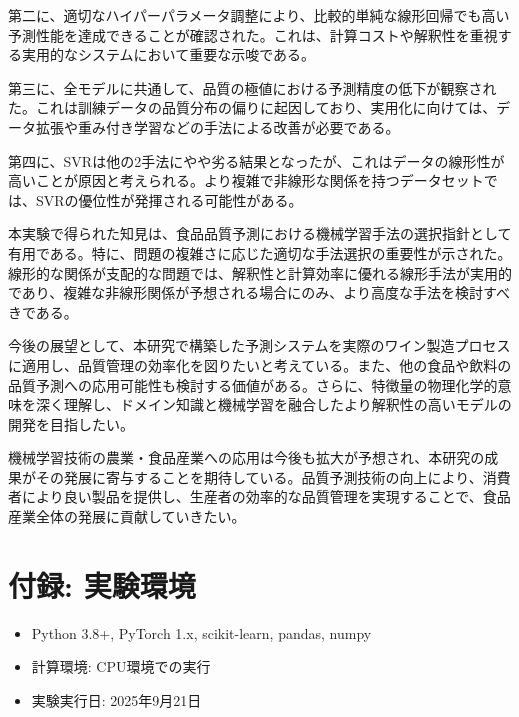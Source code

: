 \documentclass[12pt,a4paper,dvipdfmx]{jsarticle}
\begin{document}
第二に、適切なハイパーパラメータ調整により、比較的単純な線形回帰でも高い予測性能を達成できることが確認された。これは、計算コストや解釈性を重視する実用的なシステムにおいて重要な示唆である。

第三に、全モデルに共通して、品質の極値における予測精度の低下が観察された。これは訓練データの品質分布の偏りに起因しており、実用化に向けては、データ拡張や重み付き学習などの手法による改善が必要である。

第四に、SVRは他の2手法にやや劣る結果となったが、これはデータの線形性が高いことが原因と考えられる。より複雑で非線形な関係を持つデータセットでは、SVRの優位性が発揮される可能性がある。

本実験で得られた知見は、食品品質予測における機械学習手法の選択指針として有用である。特に、問題の複雑さに応じた適切な手法選択の重要性が示された。線形的な関係が支配的な問題では、解釈性と計算効率に優れる線形手法が実用的であり、複雑な非線形関係が予想される場合にのみ、より高度な手法を検討すべきである。

今後の展望として、本研究で構築した予測システムを実際のワイン製造プロセスに適用し、品質管理の効率化を図りたいと考えている。また、他の食品や飲料の品質予測への応用可能性も検討する価値がある。さらに、特徴量の物理化学的意味を深く理解し、ドメイン知識と機械学習を融合したより解釈性の高いモデルの開発を目指したい。

機械学習技術の農業・食品産業への応用は今後も拡大が予想され、本研究の成果がその発展に寄与することを期待している。品質予測技術の向上により、消費者により良い製品を提供し、生産者の効率的な品質管理を実現することで、食品産業全体の発展に貢献していきたい。

\section*{付録: 実験環境}

\begin{itemize}
    \item Python 3.8+, PyTorch 1.x, scikit-learn, pandas, numpy
    \item 計算環境: CPU環境での実行
    \item 実験実行日: 2025年9月21日
\end{itemize}
\end{document}
